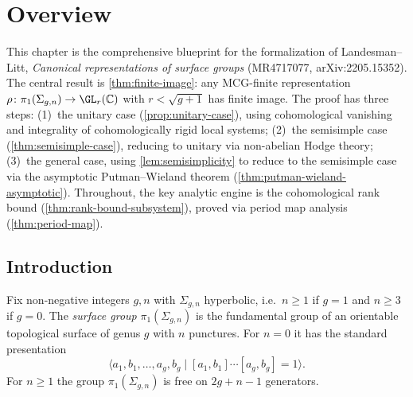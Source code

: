 \chapter{Overview}
\label{chap:overview}


This chapter is the comprehensive blueprint for the formalization of
Landesman--Litt, \emph{Canonical representations of surface groups}
(MR4717077, arXiv:2205.15352).
The central result is \cref{thm:finite-image}: any MCG-finite representation
$\rho\colon \pi_1(\Sigma_{g,n}) \to \GL_r(\mathbb{C})$ with $r < \sqrt{g+1}$
has finite image.
The proof has three steps: (1)~the unitary case
(\cref{prop:unitary-case}), using cohomological vanishing and integrality of
cohomologically rigid local systems; (2)~the semisimple case
(\cref{thm:semisimple-case}), reducing to unitary via non-abelian Hodge
theory; (3)~the general case, using \cref{lem:semisimplicity} to reduce to
the semisimple case via the asymptotic Putman--Wieland theorem
(\cref{thm:putman-wieland-asymptotic}).
Throughout, the key analytic engine is the cohomological rank bound
(\cref{thm:rank-bound-subsystem}), proved via period map analysis
(\cref{thm:period-map}).


\section{Introduction}


\begin{definition}
  \label{def:surface-group}
  Fix non-negative integers $g, n$ with $\Sigma_{g,n}$ hyperbolic, i.e.\
  $n \geq 1$ if $g = 1$ and $n \geq 3$ if $g = 0$.
  The \emph{surface group} $\pi_1(\Sigma_{g,n})$ is the fundamental group of
  an orientable topological surface of genus $g$ with $n$ punctures.
  For $n = 0$ it has the standard presentation
  \[
    \langle a_1, b_1, \ldots, a_g, b_g \mid
      [a_1,b_1]\cdots[a_g,b_g] = 1 \rangle.
  \]
  For $n \geq 1$ the group $\pi_1(\Sigma_{g,n})$ is free on $2g + n - 1$
  generators.
\end{definition}

